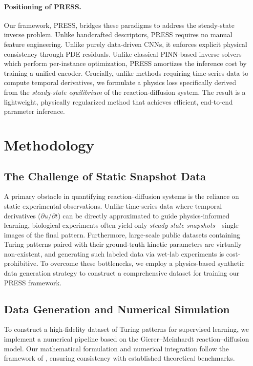 \documentclass{article} %
\begin{document}
\paragraph{Positioning of PRESS.}
Our framework, PRESS, bridges these paradigms to address the steady-state inverse problem. Unlike handcrafted descriptors, PRESS requires no manual feature engineering.
Unlike purely data-driven CNNs, it enforces explicit physical consistency through PDE residuals. Unlike classical PINN-based inverse solvers which perform per-instance optimization, PRESS amortizes the inference cost by training a unified encoder. Crucially, unlike methods requiring time-series data to compute temporal derivatives, we formulate a physics loss specifically derived from the \textit{steady-state equilibrium} of the reaction-diffusion system. The result is a lightweight, physically regularized method that achieves efficient, end-to-end parameter inference.

\section{Methodology}
\label{headings}

\subsection{The Challenge of Static Snapshot Data}
A primary obstacle in quantifying reaction--diffusion systems is the reliance on static experimental observations. Unlike time-series data where temporal derivatives ($\partial u / \partial t$) can be directly approximated to guide physics-informed learning, biological experiments often yield only \textit{steady-state snapshots}—single images of the final pattern.
Furthermore, large-scale public datasets containing Turing patterns paired with their ground-truth kinetic parameters are virtually non-existent, and generating such labeled data via wet-lab experiments is cost-prohibitive. To overcome these bottlenecks, we employ a physics-based synthetic data generation strategy to construct a comprehensive dataset for training our PRESS framework.

\subsection{Data Generation and Numerical Simulation}

To construct a high-fidelity dataset of Turing patterns for supervised learning, we implement a numerical pipeline based on the Gierer--Meinhardt reaction--diffusion model. Our mathematical formulation and numerical integration follow the framework of \cite{schnorr2023learning}, ensuring consistency with established theoretical benchmarks.
\end{document}
